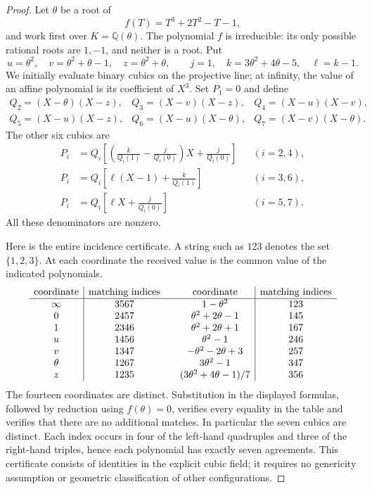\begin{proof}
Let $\theta$ be a root of
\[
 f(T)=T^3+2T^2-T-1,
\]
and work first over $K=\mathbb Q(\theta)$.  The polynomial $f$ is
irreducible: its only possible rational roots are $1,-1$, and neither
is a root.  Put
\[
 u=\theta^2,\quad v=\theta^2+\theta-1,\quad z=\theta^2+\theta,
 \qquad j=1,\quad k=3\theta^2+4\theta-5,\quad \ell=k-1.
\]
We initially evaluate binary cubics on the projective line; at infinity,
the value of an affine polynomial is its coefficient of $X^3$.
Set $P_1=0$ and define
\[
\begin{array}{lll}
 Q_2=(X-\theta)(X-z),&Q_3=(X-v)(X-z),&Q_4=(X-u)(X-v),\\
 Q_5=(X-u)(X-z),&Q_6=(X-u)(X-\theta),&Q_7=(X-v)(X-\theta).
\end{array}
\]
The other six cubics are
\begin{align*}
 P_i&=Q_i\left[\left(\frac{k}{Q_i(1)}-\frac{j}{Q_i(0)}\right)X
                  +\frac{j}{Q_i(0)}\right] &&(i=2,4),\\
 P_i&=Q_i\left[\ell(X-1)+\frac{k}{Q_i(1)}\right] &&(i=3,6),\\
 P_i&=Q_i\left[\ell X+\frac{j}{Q_i(0)}\right] &&(i=5,7).
\end{align*}
All these denominators are nonzero.

Here is the entire incidence certificate.  A string such as $123$
denotes the set $\{1,2,3\}$.  At each coordinate the received value is
the common value of the indicated polynomials.
\[
\begin{array}{c|c@{\qquad}c|c}
 \text{coordinate}&\text{matching indices}&
 \text{coordinate}&\text{matching indices}\\ \hline
 \infty&3567&1-\theta^2&123\\
 0&2457&\theta^2+2\theta-1&145\\
 1&2346&\theta^2+2\theta+1&167\\
 u&1456&\theta^2-1&246\\
 v&1347&-\theta^2-2\theta+3&257\\
 \theta&1267&3\theta^2-1&347\\
 z&1235&(3\theta^2+4\theta-1)/7&356
\end{array}
\]
The fourteen coordinates are distinct.  Substitution in the displayed
formulas, followed by reduction using $f(\theta)=0$, verifies every
equality in the table and verifies that there are no additional matches.
In particular the seven cubics are distinct.  Each index occurs in four
of the left-hand quadruples and three of the right-hand triples, hence
each polynomial has exactly seven agreements.  This certificate consists
of identities in the explicit cubic field; it requires no genericity
assumption or geometric classification of other configurations.


\end{proof}
